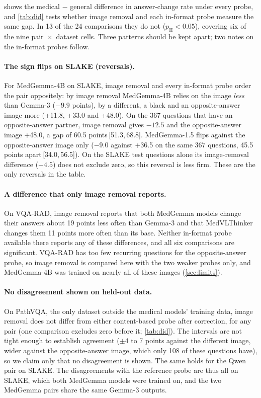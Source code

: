 \documentclass[10pt,twocolumn,letterpaper]{article}
\newcommand{\ci}[2]{\,[#1,\,#2]}  %
\begin{document}
 shows the medical $-$ general difference in answer-change rate under every probe, and
\cref{tab:did} tests whether image removal and each in-format probe measure the same gap. In 13 of the 24
comparisons they do not ($p_{\text{H}}<0.05$), covering six of the nine pair~$\times$~dataset cells. Three
patterns should be kept apart; two notes on the in-format probes follow.

\paragraph{The sign flips on SLAKE (reversals).} For MedGemma-4B on SLAKE, image removal and every in-format probe order the
pair oppositely: by image removal MedGemma-4B relies on the image \emph{less} than Gemma-3 ($-9.9$ points), by a
different, a black and an opposite-answer image more (+11.8, +33.0 and +48.0). On the 367 questions that have an
opposite-answer partner, image removal gives $-12.5$ and the opposite-answer image +48.0, a gap of 60.5
points\ci{51.3}{68.8}. MedGemma-1.5 flips against the opposite-answer image only ($-9.0$ against +36.5 on the same
367 questions, 45.5 points apart\ci{34.0}{56.5}). On the SLAKE test questions alone its image-removal difference
($-4.5$) does not exclude zero, so this reversal is less firm. These are the only reversals in the table.

\paragraph{A difference that only image removal reports.} On VQA-RAD, image removal reports that both MedGemma
models change their answers about 19 points less often than Gemma-3 and that MedVLThinker changes them 11 points
more often than its base. Neither in-format probe available there reports any of these differences, and all six
comparisons are significant. VQA-RAD has too few recurring questions for the opposite-answer probe, so image
removal is compared here with the two weaker probes only, and MedGemma-4B was trained on nearly all of these
images (\cref{sec:limits}).

\paragraph{No disagreement shown on held-out data.} On PathVQA, the only dataset outside the medical models'
training data, image removal does not differ from either content-based probe after correction, for any pair (one
comparison excludes zero before it; \cref{tab:did}). The intervals are not tight enough to establish agreement
($\pm4$ to 7 points against the different image, wider against the opposite-answer image, which only 108 of these
questions have), so we claim only that no disagreement is shown. The same holds for the Qwen pair on SLAKE. The
disagreements with the reference probe are thus all on SLAKE, which both MedGemma models were trained on, and the
two MedGemma pairs share the same Gemma-3 outputs.
\end{document}
